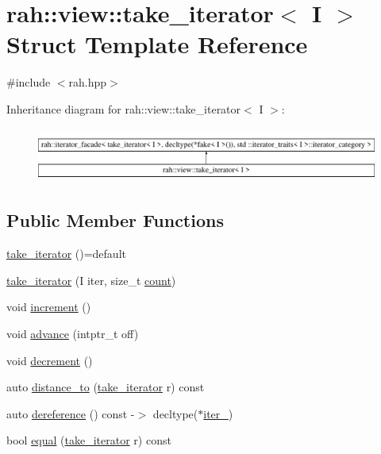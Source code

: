\hypertarget{structrah_1_1view_1_1take__iterator}{}\section{rah\+::view\+::take\+\_\+iterator$<$ I $>$ Struct Template Reference}
\label{structrah_1_1view_1_1take__iterator}


{\ttfamily \#include $<$rah.\+hpp$>$}

Inheritance diagram for rah\+::view\+::take\+\_\+iterator$<$ I $>$\+:\begin{figure}[H]
\begin{center}
\leavevmode
\includegraphics[height=1.797753cm]{structrah_1_1view_1_1take__iterator}
\end{center}
\end{figure}
\subsection*{Public Member Functions}
\begin{DoxyCompactItemize}
\item 
\mbox{\hyperlink{structrah_1_1view_1_1take__iterator_a0df2b333ea2a0deb3db7c84d12ebbaca}{take\+\_\+iterator}} ()=default
\item 
\mbox{\hyperlink{structrah_1_1view_1_1take__iterator_ad818949f1227e0676a9c1ad35860cf46}{take\+\_\+iterator}} (I iter, size\+\_\+t \mbox{\hyperlink{namespacerah_aa528865cc4a45d4eb276329554f16b4b}{count}})
\item 
void \mbox{\hyperlink{structrah_1_1view_1_1take__iterator_a5a1663517c2525b6cd6ed27f82047ba8}{increment}} ()
\item 
void \mbox{\hyperlink{structrah_1_1view_1_1take__iterator_a55e1c95489b33de8006af33b9511fb28}{advance}} (intptr\+\_\+t off)
\item 
void \mbox{\hyperlink{structrah_1_1view_1_1take__iterator_a8f956fdfee282abbd88100533033d648}{decrement}} ()
\item 
auto \mbox{\hyperlink{structrah_1_1view_1_1take__iterator_a6516d99883863b621df6717bf1d4613b}{distance\+\_\+to}} (\mbox{\hyperlink{structrah_1_1view_1_1take__iterator}{take\+\_\+iterator}} r) const
\item 
auto \mbox{\hyperlink{structrah_1_1view_1_1take__iterator_af6fe7bae848e71f68dcdf12565db2c52}{dereference}} () const -\/$>$ decltype($\ast$\mbox{\hyperlink{structrah_1_1view_1_1take__iterator_abbc947797abfa6ecaeb91c8185212152}{iter\+\_\+}})
\item 
bool \mbox{\hyperlink{structrah_1_1view_1_1take__iterator_a222e31de32a4780e1f0f0f6d9d963ded}{equal}} (\mbox{\hyperlink{structrah_1_1view_1_1take__iterator}{take\+\_\+iterator}} r) const
\end{DoxyCompactItemize}
